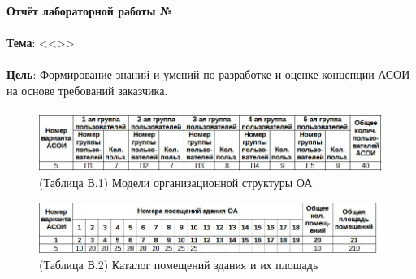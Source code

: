 \documentclass[12pt, a4paper, simple]{eskdtext}
\def \gpiDocTopic {Отчёт лабораторной работы №\gpiDocNum}
\begin{document}
    
    \thispagestyle{plain}
    \pagestyle{plain}

    \begin{center}
        \textbf{\gpiDocTopic}
    \end{center}

    \paragraph{} \textbf{Тема}: <<\gpiTopicRep>>

    \paragraph{} \textbf{Цель}:
    Формирование знаний и умений по разработке и оценке концепции АСОИ на основе требований заказчика.



    \paragraph{} \hspace{0pt}

    \begin{figure}[h!]
        \centering
        \includegraphics[width=16cm]
            {_docs/МоделиОрганизационнойСтруктурыОА.jpg}
        \caption{(Таблица В.1) Модели организационной структуры ОА}
    \end{figure}

    \begin{figure}[h!]
        \centering
        \includegraphics[width=16cm]
            {_docs/КаталогПомещенийЗданияИИхПлощадь.jpg}
        \caption{(Таблица В.2) Каталог помещений здания и их площадь}
    \end{figure}
\end{document}
